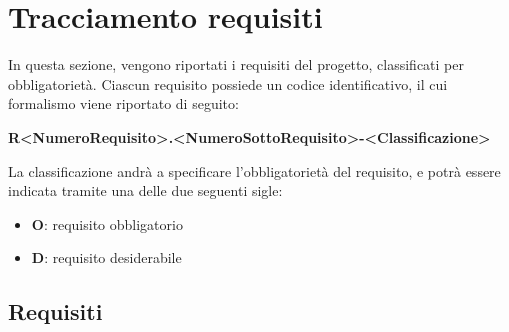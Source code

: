 \section{Tracciamento requisiti}
In questa sezione, vengono riportati i requisiti del progetto, classificati per obbligatorietà. Ciascun requisito possiede un codice identificativo, il cui formalismo viene riportato di seguito:
\begin{center}
	\textbf{R<NumeroRequisito>.<NumeroSottoRequisito>-<Classificazione>}
\end{center}
La classificazione andrà a specificare l'obbligatorietà del requisito, e potrà essere indicata tramite una delle due seguenti sigle:
\begin{itemize}
	\item \textbf{O}: requisito obbligatorio
	\item \textbf{D}: requisito desiderabile
\end{itemize}

\subsection{Requisiti}

